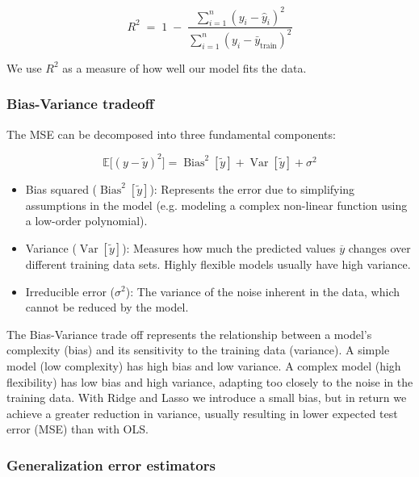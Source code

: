 \documentclass[amssymb,twocolumn,aps]{revtex4-2}
\begin{document}
\begin{equation}
    R^2 \;=\; 1 \;-\; \frac{\sum_{i=1}^n (y_i - \hat y_i)^2}{\sum_{i=1}^n (y_i - \bar y_{\text{train}})^2}
\end{equation}

We use $R^2$ as a measure of how well our model fits the data. 

\subsubsection{Bias-Variance tradeoff}
\label{subsubsec:bias_var_theory}

The MSE can be decomposed into three fundamental components: 

\begin{equation}
    \mathbb{E}\!\big[(y-\tilde y)^2\big]
= \operatorname{Bias}^2[\tilde y]
+ \operatorname{Var}[\tilde y]
+ \sigma^2
\end{equation}

\begin{itemize}
    \item Bias squared ($\operatorname{Bias}^2[\tilde y]$): Represents the error due to simplifying assumptions in the model (e.g. modeling a complex non-linear function using a low-order polynomial). 
    \item Variance ($\operatorname{Var}[\tilde y]$): Measures how much the predicted values $\overline{y}$ changes over different training data sets. Highly flexible models usually have high variance. 
    \item Irreducible error ($\sigma^2$): The variance of the noise inherent in the data, which cannot be reduced by the model. 
\end{itemize}

The Bias-Variance trade off represents the relationship between a model's complexity (bias) and its sensitivity to the training data (variance). 
A simple model (low complexity) has high bias and low variance. 
A complex model (high flexibility) has low bias and high variance, adapting too closely to the noise in the training data. With Ridge and Lasso we introduce a small bias, but in return we achieve a greater reduction in variance, usually resulting in lower expected test error (MSE) than with OLS. 

\subsubsection{Generalization error estimators}
\label{subsubsec:error_theory}
\end{document}
